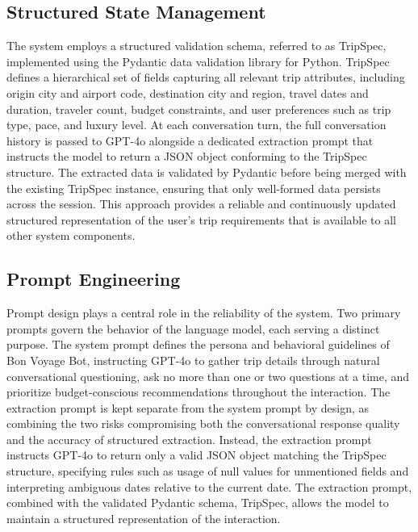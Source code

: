 \documentclass{article}
\begin{document}
\subsection{Structured State Management}
The system employs a structured validation schema, referred to as TripSpec, implemented using the Pydantic data validation library for Python. TripSpec defines a hierarchical set of fields capturing all relevant trip attributes, including origin city and airport code, destination city and region, travel dates and duration, traveler count, budget constraints, and user preferences such as trip type, pace, and luxury level. At each conversation turn, the full conversation history is passed to GPT-4o alongside a dedicated extraction prompt that instructs the model to return a JSON object conforming to the TripSpec structure. The extracted data is validated by Pydantic before being merged with the existing TripSpec instance, ensuring that only well-formed data persists across the session. This approach provides a reliable and continuously updated structured representation of the user's trip requirements that is available to all other system components. 

\subsection{Prompt Engineering}
Prompt design plays a central role in the reliability of the system. Two primary prompts govern the behavior of the language model, each serving a distinct purpose. The system prompt defines the persona and behavioral guidelines of Bon Voyage Bot, instructing GPT-4o to gather trip details through natural conversational questioning, ask no more than one or two questions at a time, and prioritize budget-conscious recommendations throughout the interaction. The extraction prompt is kept separate from the system prompt by design, as combining the two risks compromising both the conversational response quality and the accuracy of structured extraction. Instead, the extraction prompt instructs GPT-4o to return only a valid JSON object matching the TripSpec structure, specifying rules such as usage of null values for unmentioned fields and interpreting ambiguous dates relative to the current date. The extraction prompt, combined with the validated Pydantic schema, TripSpec, allows the model to maintain a structured representation of the interaction. 
\end{document}
